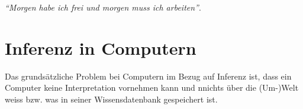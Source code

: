\noindent\hspace*{12mm}\textit{``Morgen habe ich frei und morgen muss ich arbeiten''}.

\section{Inferenz in Computern}
\label{sec:inferenz-in-computer}

Das grundsätzliche Problem bei Computern im Bezug auf Inferenz ist, dass ein Computer keine Interpretation vornehmen kann und nnichts über die (Um-)Welt weiss bzw. was in seiner Wissensdatenbank gespeichert ist.

